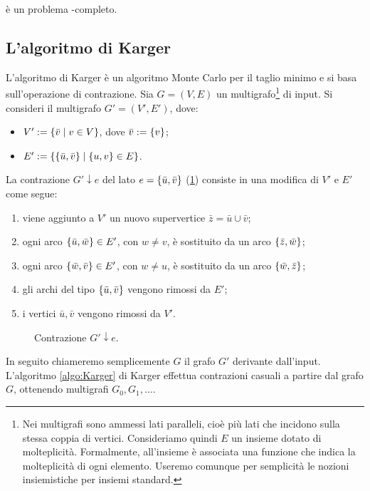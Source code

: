 \noindent\MinCut è un problema \NPO-completo.


\subsection{L'algoritmo di Karger}
L'algoritmo di Karger è un algoritmo Monte Carlo per il taglio minimo e si basa sull'operazione di contrazione.
Sia $G=(V,E)$ un multigrafo\footnote{Nei multigrafi sono ammessi lati paralleli, cioè più lati che incidono sulla stessa coppia di vertici. Consideriamo quindi $E$ un insieme dotato di molteplicità. Formalmente, all'insieme è associata una funzione che indica la molteplicità di ogni elemento. Useremo comunque per semplicità le nozioni insiemistiche per insiemi standard.} di input. Si consideri il multigrafo $G'=(V',E')$, dove:
\begin{itemize}
	\item $V':=\left\{ \bar v\mid v\in V \right\}$, dove $\bar v:=\left\{ v \right\}$;
	\item $E':=\left\{ \left\{ \bar u,\bar v \right\}\mid \left\{ u,v \right\}\in E \right\}$.
\end{itemize}
La contrazione $G'\downarrow e$ del lato $e=\left\{ \bar u,\bar v \right\}$ (\cref{fig:contrazione}) consiste in una modifica di $V'$ e $E'$ come segue:
\begin{enumerate}
	\item viene aggiunto a $V'$ un nuovo supervertice $\bar z=\bar u\cup\bar v$;
	\item ogni arco $\left\{ \bar u,\bar w \right\}\in E'$, con $w\neq v$, è sostituito da un arco $\left\{ \bar z,\bar w \right\}$;
	\item ogni arco $\left\{ \bar w,\bar v \right\}\in E'$, con $w\neq u$, è sostituito da un arco $\left\{ \bar w,\bar z \right\}$;
	\item gli archi del tipo $\left\{ \bar u,\bar v \right\}$ vengono rimossi da $E'$;
	\item i vertici $\bar u,\bar v$ vengono rimossi da $V'$.
\end{enumerate}

\begin{figure}[ht]
	\centering
	
	\caption{Contrazione $G'\downarrow e$.}
	\label{fig:contrazione}
\end{figure}

In seguito chiameremo semplicemente $G$ il grafo $G'$ derivante dall'input. L'algoritmo \ref{algo:Karger} di Karger effettua contrazioni casuali a partire dal grafo $G$, ottenendo multigrafi $G_0,G_1,\dots$.

